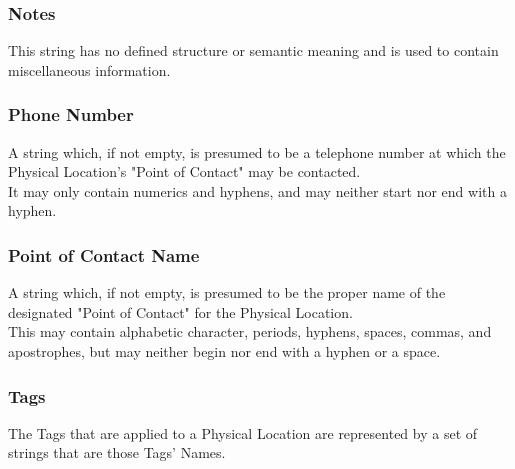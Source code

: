 \subsubsection{Notes}
This string has no defined structure or semantic meaning and is used to contain
miscellaneous information.

\subsubsection{Phone Number}
A string which, if not empty, is presumed to be a telephone number at which the
Physical Location's "Point of Contact" may be contacted.\\
It may only contain numerics and hyphens, and may neither start nor end with a
hyphen.

\subsubsection{Point of Contact Name}
A string which, if not empty, is presumed to be the proper name of the
designated "Point of Contact" for the Physical Location.\\
This may contain alphabetic character, periods, hyphens, spaces, commas, and
apostrophes, but may neither begin nor end with a hyphen or a space.

\subsubsection{Tags}
The Tags that are applied to a Physical Location are represented by a set of
strings that are those Tags' Names.
